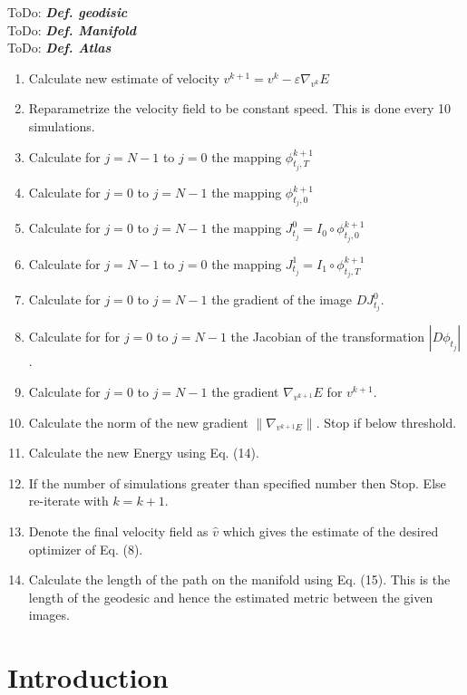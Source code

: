 \documentclass[final, paper=letter,5p,times,twocolumn]{elsarticle}
\newcommand{\ToDo}[1]{ToDo: \textbf{\textit{#1}}}
\theoremstyle{definition}
\begin{document}
{\ToDo{Def. geodisic} \\
\ToDo{Def. Manifold} \\
\ToDo{Def. Atlas} \\


\begin{enumerate}
\item Calculate new estimate of velocity $v^{k+1} = v^{k} - \varepsilon \nabla_{v^{k}} E$
\item Reparametrize the velocity field to be constant speed. This is done every 10 simulations.
\item Calculate for $j = N-1$ to $j = 0$ the mapping $\phi_{t_{j},T}^{k+1}$
\item Calculate for $j = 0$ to $j = N-1$ the mapping $\phi_{t_{j},0}^{k+1}$
\item Calculate for $j = 0$ to $j = N-1$ the mapping $J_{t_{j}}^{0} = I_{0} \circ \phi_{t_{j},0}^{k+1}$
\item Calculate for $j = N-1$ to $j = 0$ the mapping $J_{t_{j}}^{1} = I_{1} \circ \phi_{t_{j},T}^{k+1}$
\item Calculate for $j = 0$ to $j = N-1$ the gradient of the image $DJ_{t_{j}}^{0}$.
\item Calculate for for $j = 0$ to $j = N-1$ the Jacobian of the transformation $|D \phi_{t_{j}}|$.
\item Calculate for $j = 0$ to $j = N-1$ the gradient $\nabla_{v^{k+1}}E$ for $v^{k+1}$.
\item Calculate the norm of the new gradient $\| \nabla_{v^{k+1}E} \|$. Stop if below threshold.
\item Calculate the new Energy using Eq. (14).
\item If the number of simulations greater than specified number then Stop. Else re-iterate with $k = k +1.$
\item Denote the final velocity field as $\hat{v}$ which gives the estimate of the desired optimizer of Eq. (8).
\item Calculate the length of the path on the manifold using Eq. (15). This is the length of the geodesic and hence the estimated metric between the given images.
\end{enumerate}



\section{Introduction}

}
\end{document}
